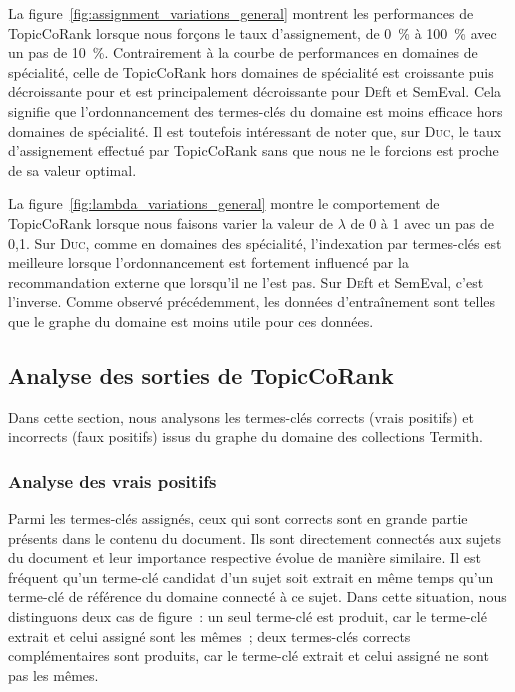         La figure~\ref{fig:assignment_variations_general} montrent les
        performances de TopicCoRank lorsque nous forçons le taux d'assignement,
        de 0~\% à 100~\% avec un pas de 10~\%. Contrairement à la courbe de
        performances en domaines de spécialité, celle de TopicCoRank hors
        domaines de spécialité est croissante puis décroissante pour 
        et est principalement décroissante pour \textsc{De}ft et SemEval. Cela signifie que
        l'ordonnancement des termes-clés du domaine est moins efficace hors
        domaines de spécialité. Il est toutefois intéressant de noter que, sur
        \textsc{Duc}, le taux d'assignement effectué par TopicCoRank sans que
        nous ne le forcions est proche de sa valeur optimal.
        

        La figure~\ref{fig:lambda_variations_general} montre le comportement de
        TopicCoRank lorsque nous faisons varier la valeur de $\lambda$ de 0 à 1
        avec un pas de 0,1. Sur \textsc{Duc}, comme en domaines des spécialité,
        l'indexation par termes-clés est meilleure lorsque l'ordonnancement est
        fortement influencé par la recommandation externe que lorsqu'il ne l'est
        pas. Sur \textsc{De}ft et SemEval, c'est l'inverse. Comme observé précédemment, les données
        d'entraînement sont telles que le graphe du domaine est moins utile pour
        ces données.
        

    \subsection{Analyse des sorties de TopicCoRank}
    \label{subsec:main-domain_specific_keyphrase_annotation-supervised_automatic_keyphrase_annotation-error_analysis}
      Dans cette section, nous analysons les termes-clés corrects (vrais
      positifs) et incorrects (faux positifs) issus du graphe du domaine des
      collections Termith.

      \subsubsection{Analyse des vrais positifs}
      \label{subsec:main-domain_specific_keyphrase_annotation-supervised_automatic_keyphrase_annotation-error_analysis-true_positives}
        Parmi les termes-clés assignés, ceux qui sont corrects sont en grande
        partie présents dans le contenu du document. Ils sont directement
        connectés aux sujets du document et leur importance respective évolue de
        manière similaire. Il est fréquent qu'un terme-clé candidat d'un sujet
        soit extrait en même temps qu'un terme-clé de référence du domaine
        connecté à ce sujet. Dans cette situation, nous distinguons deux cas de
        figure~: un seul terme-clé est produit, car le terme-clé extrait et
        celui assigné sont les mêmes~; deux termes-clés corrects complémentaires
        sont produits, car le terme-clé extrait et celui assigné ne sont pas les
        mêmes.
        
